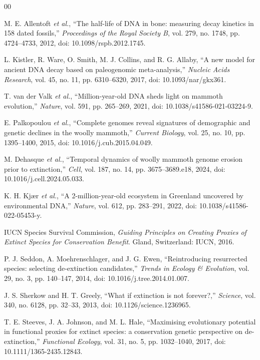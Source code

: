\documentclass[conference]{IEEEtran}
\begin{document}
\begin{thebibliography}{00}

 M. E. Allentoft \emph{et al.}, ``The half-life of DNA in bone: measuring decay kinetics in 158 dated fossils,'' \emph{Proceedings of the Royal Society B}, vol. 279, no. 1748, pp. 4724--4733, 2012, doi: 10.1098/rspb.2012.1745.

 L. Kistler, R. Ware, O. Smith, M. J. Collins, and R. G. Allaby, ``A new model for ancient DNA decay based on paleogenomic meta-analysis,'' \emph{Nucleic Acids Research}, vol. 45, no. 11, pp. 6310--6320, 2017, doi: 10.1093/nar/gkx361.

 T. van der Valk \emph{et al.}, ``Million-year-old DNA sheds light on mammoth evolution,'' \emph{Nature}, vol. 591, pp. 265--269, 2021, doi: 10.1038/s41586-021-03224-9.

 E. Palkopoulou \emph{et al.}, ``Complete genomes reveal signatures of demographic and genetic declines in the woolly mammoth,'' \emph{Current Biology}, vol. 25, no. 10, pp. 1395--1400, 2015, doi: 10.1016/j.cub.2015.04.049.

 M. Dehasque \emph{et al.}, ``Temporal dynamics of woolly mammoth genome erosion prior to extinction,'' \emph{Cell}, vol. 187, no. 14, pp. 3675--3689.e18, 2024, doi: 10.1016/j.cell.2024.05.033.

 K. H. Kj\ae r \emph{et al.}, ``A 2-million-year-old ecosystem in Greenland uncovered by environmental DNA,'' \emph{Nature}, vol. 612, pp. 283--291, 2022, doi: 10.1038/s41586-022-05453-y.

 IUCN Species Survival Commission, \emph{Guiding Principles on Creating Proxies of Extinct Species for Conservation Benefit}. Gland, Switzerland: IUCN, 2016.

 P. J. Seddon, A. Moehrenschlager, and J. G. Ewen, ``Reintroducing resurrected species: selecting de-extinction candidates,'' \emph{Trends in Ecology \& Evolution}, vol. 29, no. 3, pp. 140--147, 2014, doi: 10.1016/j.tree.2014.01.007.

 J. S. Sherkow and H. T. Greely, ``What if extinction is not forever?,'' \emph{Science}, vol. 340, no. 6128, pp. 32--33, 2013, doi: 10.1126/science.1236965.

 T. E. Steeves, J. A. Johnson, and M. L. Hale, ``Maximising evolutionary potential in functional proxies for extinct species: a conservation genetic perspective on de-extinction,'' \emph{Functional Ecology}, vol. 31, no. 5, pp. 1032--1040, 2017, doi: 10.1111/1365-2435.12843.


\end{thebibliography}
\end{document}
